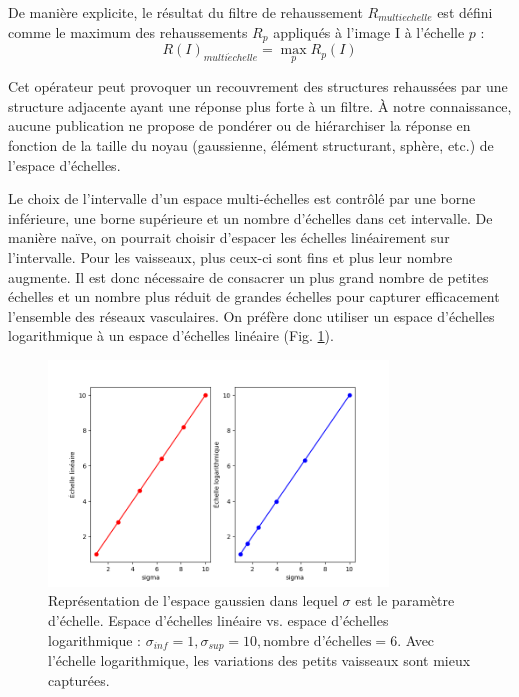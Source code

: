  De manière explicite, le résultat du filtre de rehaussement $R_{multi echelle}$ est défini comme le maximum des rehaussements $R_{p}$ appliqués à l'image I à l'échelle $p$ :
  \begin{equation}
    R(I)_{multi \acute echelle} = \max_{p}R_{p}(I) 
  \end{equation}
  
  Cet opérateur peut provoquer un recouvrement des structures rehaussées par une structure adjacente ayant une réponse plus forte à un filtre. À notre connaissance, aucune publication ne propose de pondérer ou de hiérarchiser la réponse en fonction de la taille du noyau (gaussienne, élément structurant, sphère, etc.) de l'espace d'échelles.

  Le choix de l'intervalle d'un espace multi-échelles est contrôlé par une borne inférieure, une borne supérieure et un nombre d'échelles dans cet intervalle. De manière naïve, on pourrait choisir d'espacer les échelles linéairement sur l'intervalle. Pour les vaisseaux, plus ceux-ci sont fins et plus leur nombre augmente. Il est donc nécessaire de consacrer un plus grand nombre de petites échelles  et un nombre plus réduit de grandes échelles pour capturer efficacement l'ensemble des réseaux vasculaires. On préfère donc utiliser un espace d'échelles logarithmique à un espace d'échelles linéaire (Fig. \ref{fig:scale_space}).
  \begin{figure}[!ht]
    \centering
    \includegraphics[height=6cm]{Images/scale_space.png}
    \caption{Représentation de l'espace gaussien dans lequel $\sigma$ est le paramètre d'échelle. Espace d'échelles linéaire vs. espace d'échelles logarithmique : $\sigma_{inf}=1, \sigma_{sup}=10, \textrm{nombre d'échelles}=6$. Avec l'échelle logarithmique, les variations des petits vaisseaux sont mieux capturées.}
    \label{fig:scale_space}
  \end{figure}
